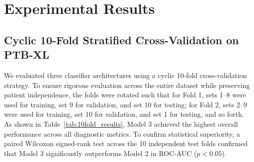\documentclass[12pt]{elsarticle}
\begin{document}
\section{Experimental Results}
\label{sec:results}

\subsection{Cyclic 10-Fold Stratified Cross-Validation on PTB-XL}
We evaluated three classifier architectures using a cyclic 10-fold cross-validation strategy. To ensure rigorous evaluation across the entire dataset while preserving patient independence, the folds were rotated such that for Fold 1, sets 1--8 were used for training, set 9 for validation, and set 10 for testing; for Fold 2, sets 2--9 were used for training, set 10 for validation, and set 1 for testing, and so forth. As shown in Table~\ref{tab:10fold_results}, Model 3 achieved the highest overall performance across all diagnostic metrics. To confirm statistical superiority, a paired Wilcoxon signed-rank test across the 10 independent test folds confirmed that Model 3 significantly outperforms Model 2 in ROC-AUC ($p < 0.05$).

\begin{table}[t]
\caption{10-Fold Stratified Cross-Validation Benchmark Results on PTB-XL. Mean $\pm$ Std [95\% CI] across 10 cyclic folds.}
\label{tab:10fold_results}
\centering
\small
\setlength{\tabcolsep}{4.5pt}
\end{table}
\end{document}
